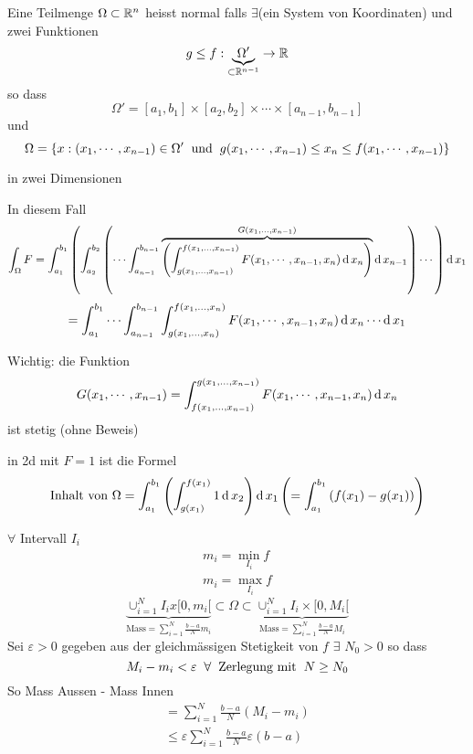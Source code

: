\begin{Def}
  Eine Teilmenge $\Omega\subset\mathbb{R}^n$ heisst normal falls $\exists$(ein System von Koordinaten) und zwei Funktionen
  \[g\leq f:\underbrace{\Omega'}_{\subset\mathbb{R}^{n-1}}\rightarrow\mathbb{R}\]
  so dass
  \[\Omega'=\left[ a_1,b_1 \right]\times\left[ a_2,b_2 \right]\times\cdots\times\left[ a_{n-1},b_{n-1} \right]\]
  und
  \[\Omega=\left\{ x:(x_1,\cdots,x_{n-1})\in\Omega'\hspace{2mm}\text{und}\hspace{2mm} g(x_1,\cdots,x_{n-1})\leq x_n\leq f(x_1,\cdots,x_{n-1}) \right\}\]
\end{Def}
\begin{Bsp}
  in zwei Dimensionen
\end{Bsp}
\begin{Bem}
  In diesem Fall
  \[\int_\Omega F=\int_{a_1}^{b_1}\left( \int_{a_2}^{b_2}\left( \cdots \int_{a_{n-1}}^{b_{n-1}}\overbrace{\left( \int^{f(x_1,\ldots,x_{n-1})}_{g(x_1,\ldots,x_{n-1})}F(x_1,\cdots,x_{n-1},x_n)\operatorname{d} x_n \right)}^{G(x_1,\ldots,x_{n-1})}\operatorname{d} x_{n-1} \right)\cdots \right)\operatorname{d} x_1\]
  \[=\int_{a_1}^{b_1}\cdots\int_{a_{n-1}}^{b_{n-1}}\int_{g(x_1,\ldots,x_n)}^{f(x_1,\ldots,x_n)}F(x_1,\cdots,x_{n-1},x_n)\operatorname{d} x_n\cdots\operatorname{d} x_1\]
\end{Bem}
\begin{Bem}
  Wichtig: die Funktion
  \[G(x_1,\cdots,x_{n-1})=\int_{f(x_1,\ldots,x_{n-1})}^{g(x_1,\ldots,x_{n-1})}F(x_1,\cdots,x_{n-1},x_n)\operatorname{d} x_n\]
  ist stetig (ohne Beweis)
\end{Bem}
\begin{Bem}
  in 2d mit $F=1$ ist die Formel
  \[\text{Inhalt von $\Omega$} = \int_{a_1}^{b_1}\left( \int_{g(x_1)}^{f(x_1)}1\operatorname{d} x_2 \right)\operatorname{d} x_1 \left( =\int_{a_1}^{b_1}\left( f(x_1)-g(x_1) \right) \right)\]
\end{Bem}
$\forall$ Intervall $I_i$
\begin{eqnarray*}
  m_i=\min_{I_i}f\\
  m_i=\max_{I_i}f
\end{eqnarray*}
\[\underbrace{\cup_{i=1}^NI_ix[0,m_i[}_{\text{Mass}=\sum^N_{i=1}\frac{b-a}{N}m_i}\subset\Omega\subset \underbrace{\cup_{i=1}^NI_i\times [0,M_i[}_{\text{Mass}=\sum^N_{i=1}\frac{b-a}{N}M_i}\]
Sei $\varepsilon>0$ gegeben aus der gleichmässigen Stetigkeit von $f$ $\exists$ $N_0>0$ so dass
\[M_i-m_i<\varepsilon\hspace{2mm}\forall \hspace{2mm}\text{Zerlegung mit}\hspace{2mm} N\geq N_0\]
So Mass Aussen - Mass Innen
\begin{eqnarray*}
  =\sum^N_{i=1}\frac{b-a}{N}(M_i-m_i)\\
  \leq \varepsilon \sum^N_{i=1}\frac{b-a}{N}\varepsilon(b-a)
\end{eqnarray*}
